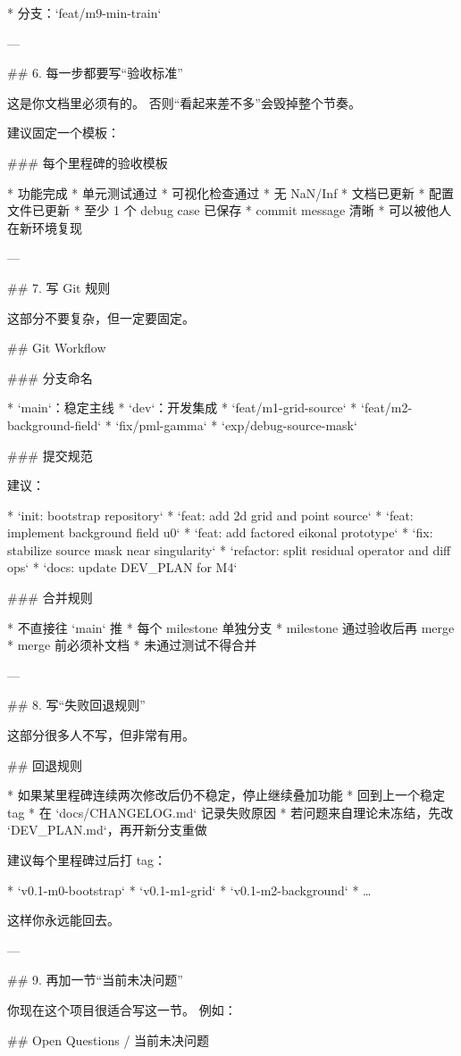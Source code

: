 * 分支：`feat/m9-min-train`

---

## 6. 每一步都要写“验收标准”

这是你文档里必须有的。
否则“看起来差不多”会毁掉整个节奏。

建议固定一个模板：

### 每个里程碑的验收模板

* 功能完成
* 单元测试通过
* 可视化检查通过
* 无 NaN/Inf
* 文档已更新
* 配置文件已更新
* 至少 1 个 debug case 已保存
* commit message 清晰
* 可以被他人在新环境复现

---

## 7. 写 Git 规则

这部分不要复杂，但一定要固定。

## Git Workflow

### 分支命名

* `main`：稳定主线
* `dev`：开发集成
* `feat/m1-grid-source`
* `feat/m2-background-field`
* `fix/pml-gamma`
* `exp/debug-source-mask`

### 提交规范

建议：

* `init: bootstrap repository`
* `feat: add 2d grid and point source`
* `feat: implement background field u0`
* `feat: add factored eikonal prototype`
* `fix: stabilize source mask near singularity`
* `refactor: split residual operator and diff ops`
* `docs: update DEV_PLAN for M4`

### 合并规则

* 不直接往 `main` 推
* 每个 milestone 单独分支
* milestone 通过验收后再 merge
* merge 前必须补文档
* 未通过测试不得合并

---

## 8. 写“失败回退规则”

这部分很多人不写，但非常有用。

## 回退规则

* 如果某里程碑连续两次修改后仍不稳定，停止继续叠加功能
* 回到上一个稳定 tag
* 在 `docs/CHANGELOG.md` 记录失败原因
* 若问题来自理论未冻结，先改 `DEV_PLAN.md`，再开新分支重做

建议每个里程碑过后打 tag：

* `v0.1-m0-bootstrap`
* `v0.1-m1-grid`
* `v0.1-m2-background`
* …

这样你永远能回去。

---

## 9. 再加一节“当前未决问题”

你现在这个项目很适合写这一节。
例如：

## Open Questions / 当前未决问题

